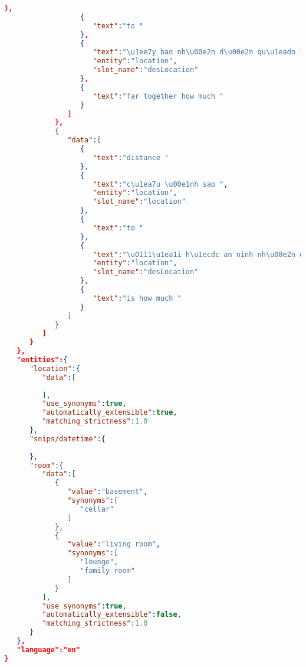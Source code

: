 \begin{lstlisting}[language=json,firstnumber=1]
                  },
                  {
                     "text":"to "
                  },
                  {
                     "text":"\u1ee7y ban nh\u00e2n d\u00e2n qu\u1eadn 12 ",
                     "entity":"location",
                     "slot_name":"desLocation"
                  },
                  {
                     "text":"far together how much "
                  }
               ]
            },
            {
               "data":[
                  {
                     "text":"distance "
                  },
                  {
                     "text":"c\u1ea7u \u00e1nh sao ",
                     "entity":"location",
                     "slot_name":"location"
                  },
                  {
                     "text":"to "
                  },
                  {
                     "text":"\u0111\u1ea1i h\u1ecdc an ninh nh\u00e2n d\u00e2n ",
                     "entity":"location",
                     "slot_name":"desLocation"
                  },
                  {
                     "text":"is how much "
                  }
               ]
            }
         ]
      }
   },
   "entities":{
      "location":{
         "data":[
            
         ],
         "use_synonyms":true,
         "automatically_extensible":true,
         "matching_strictness":1.0
      },
      "snips/datetime":{
         
      },
      "room":{
         "data":[
            {
               "value":"basement",
               "synonyms":[
                  "cellar"
               ]
            },
            {
               "value":"living room",
               "synonyms":[
                  "lounge",
                  "family room"
               ]
            }
         ],
         "use_synonyms":true,
         "automatically_extensible":false,
         "matching_strictness":1.0
      }
   },
   "language":"en"
}


\end{lstlisting}
